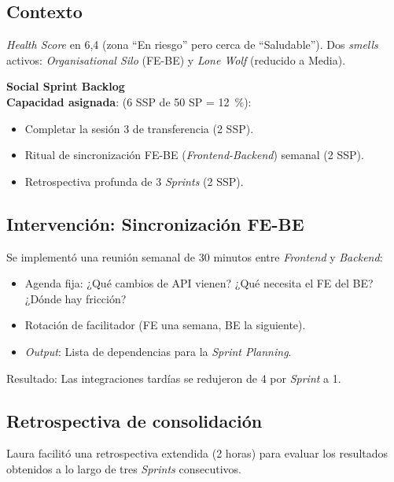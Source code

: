 \subsection{Contexto}

\textit{Health Score} en 6,4 (zona ``En riesgo'' pero cerca de ``Saludable''). Dos \textit{smells} activos: \textit{Organisational Silo} (FE-BE) y \textit{Lone Wolf} (reducido a Media).

\textbf{Social Sprint Backlog}\mbox{}\\[-0.3\baselineskip]

\textbf{Capacidad asignada}: (6 SSP de 50 SP = 12~\%):
\begin{itemize}
    \item Completar la sesión 3 de transferencia (2 SSP).
    \item Ritual de sincronización FE-BE (\textit{Frontend-Backend}) semanal (2 SSP).
    \item Retrospectiva profunda de 3 \textit{Sprints} (2 SSP).
\end{itemize}

\subsection{Intervención: Sincronización FE-BE}

Se implementó una reunión semanal de 30 minutos entre \textit{Frontend} y \textit{Backend}:

\begin{itemize}
    \item Agenda fija: ¿Qué cambios de API vienen? ¿Qué necesita el FE del BE? ¿Dónde hay fricción?
    \item Rotación de facilitador (FE una semana, BE la siguiente).
    \item \textit{Output}: Lista de dependencias para la \textit{Sprint Planning}.
\end{itemize}

Resultado: Las integraciones tardías se redujeron de 4 por \textit{Sprint} a 1.

\subsection{Retrospectiva de consolidación}

Laura facilitó una retrospectiva extendida (2 horas) para evaluar los resultados obtenidos a lo largo de tres \textit{Sprints} consecutivos.

